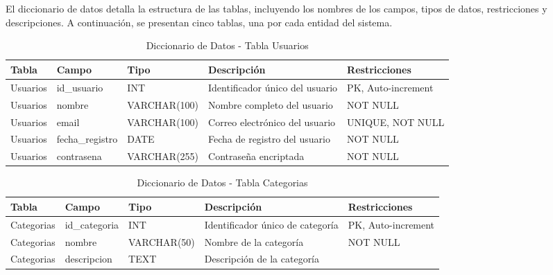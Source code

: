\documentclass[10pt,a4paper]{article}
\begin{document}
\section{\color{colorIPN}{Diccionario de Datos}}
El diccionario de datos detalla la estructura de las tablas, incluyendo los nombres de los campos, tipos de datos, restricciones y descripciones. A continuación, se presentan cinco tablas, una por cada entidad del sistema.

\begin{table}[H]
	\centering
	\hspace*{0pt}
	\begin{tabular}{p{2cm}|p{2.5cm}|>{\raggedright\arraybackslash}p{3cm}|p{4cm}|p{2.5cm}}
		\hline \hline
		\textbf{Tabla} & \textbf{Campo} & \textbf{Tipo} & \textbf{Descripción} & \textbf{Restricciones} \\ \hline \hline
		Usuarios & id\_usuario & INT & Identificador único del usuario & PK, Auto-increment \\ \hline
		Usuarios & nombre & VARCHAR(100) & Nombre completo del usuario & NOT NULL \\ \hline
		Usuarios & email & VARCHAR(100) & Correo electrónico del usuario & UNIQUE, NOT NULL \\ \hline
		Usuarios & fecha\_registro & DATE & Fecha de registro del usuario & NOT NULL \\ \hline
		Usuarios & contrasena & VARCHAR(255) & Contraseña encriptada & NOT NULL \\ \hline
	\end{tabular}
	\caption{Diccionario de Datos - Tabla Usuarios}
	\label{tab:diccionario_usuarios}
\end{table}

\begin{table}[H]
	\centering
	\hspace*{0pt}
	\begin{tabular}{p{2cm}|p{2.5cm}|>{\raggedright\arraybackslash}p{3cm}|p{4cm}|p{2.5cm}}
		\hline \hline
		\textbf{Tabla} & \textbf{Campo} & \textbf{Tipo} & \textbf{Descripción} & \textbf{Restricciones} \\ \hline \hline
		Categorias & id\_categoria & INT & Identificador único de categoría & PK, Auto-increment \\ \hline
		Categorias & nombre & VARCHAR(50) & Nombre de la categoría & NOT NULL \\ \hline
		Categorias & descripcion & TEXT & Descripción de la categoría & \\ \hline
	\end{tabular}
	\caption{Diccionario de Datos - Tabla Categorias}
	\label{tab:diccionario_categorias}
\end{table}
\end{document}
